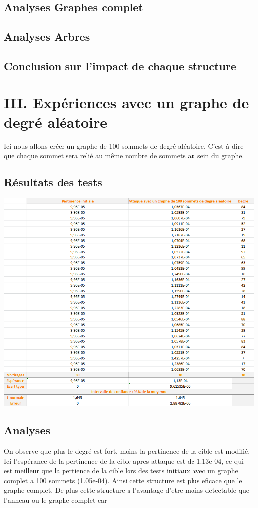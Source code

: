 \documentclass[a4paper,11pt]{article}
\begin{document}
	\subsection{Analyses Graphes complet}
		
	\subsection{Analyses Arbres}
		
	\subsection{Conclusion sur l'impact de chaque structure}

\section{III.	Expériences avec un graphe de degré aléatoire}
	Ici nous allons créer un graphe de 100 sommets de degré aléatoire. C'est à dire que chaque sommet sera relié au même nombre de sommets au sein du graphe.
	\subsection{Résultats des tests}
		\includegraphics[scale = 0.5]{Captures/ranking4.PNG}\\
		
	\subsection{Analyses}
		On observe que plus le degré est fort, moins la pertinence de la cible est modifié. Ici l'espérance de la pertinence de la cible apres attaque est de 1.13e-04, ce qui est 
		meilleur que la pertience de la cible lors des tests initiaux avec un graphe complet a 100 sommets (1.05e-04). Ainsi cette structure est plus eficace que le graphe complet.
		De plus cette structure a l'avantage d'etre moins detectable que l'anneau ou le graphe complet car 
	
\end{document}
